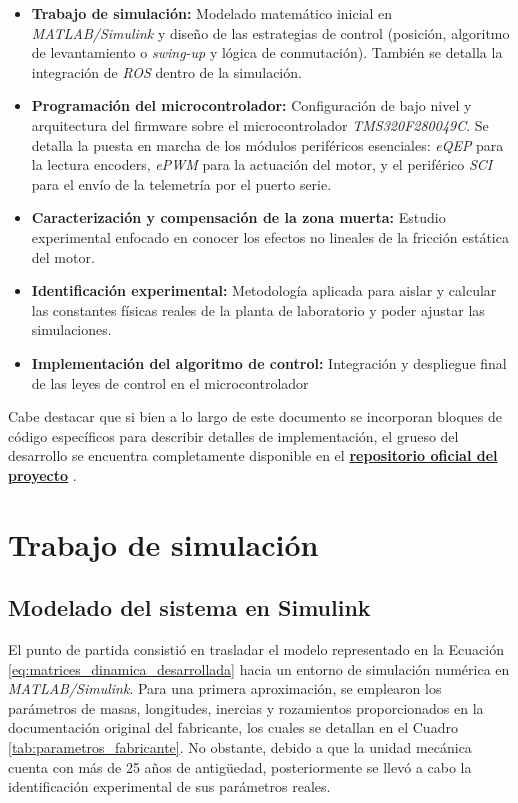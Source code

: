\documentclass[11pt,fleqn]{book} %
\begin{document}
\begin{itemize}
	\item \textbf{Trabajo de simulación:} Modelado matemático inicial en \textit{MATLAB/Simulink} y diseño de las estrategias de control (posición, algoritmo de levantamiento o \textit{swing-up} y lógica de conmutación). También se detalla la integración de \textit{ROS} dentro de la simulación.
	
	\item \textbf{Programación del microcontrolador:} Configuración de bajo nivel y arquitectura del firmware sobre el microcontrolador \textit{TMS320F280049C}. Se detalla la puesta en marcha de los módulos periféricos esenciales:\textit{ eQEP} para la lectura encoders, \textit{ePWM} para la actuación del motor, y el periférico \textit{SCI} para el envío de la telemetría por el puerto serie.
	
	\item \textbf{Caracterización y compensación de la zona muerta:} Estudio experimental enfocado en conocer los efectos no lineales de la fricción estática del motor.
	
	\item \textbf{Identificación experimental:} Metodología aplicada para aislar y calcular las constantes físicas reales de la planta de laboratorio y poder ajustar las simulaciones.
	
	\item \textbf{Implementación del algoritmo de control:} Integración y despliegue final de las leyes de control en el microcontrolador
\end{itemize}

Cabe destacar que si bien a lo largo de este documento se incorporan bloques de código específicos para describir detalles de implementación, el grueso del desarrollo se encuentra completamente disponible en el \href{https://github.com/MPV247/TFG_Control_MiguelPorcar}{\textbf{repositorio oficial del proyecto}} \cite{Porcar2026TFG}.

\newpage
\section{Trabajo de simulación}

\subsection{Modelado del sistema en Simulink}
\label{cap:modelado_sim}
El punto de partida consistió en trasladar el modelo representado en la Ecuación \ref{eq:matrices_dinamica_desarrollada} hacia un entorno de simulación numérica en \textit{MATLAB/Simulink}. Para una primera aproximación, se emplearon los parámetros de masas, longitudes, inercias y rozamientos proporcionados en la documentación original del fabricante, los cuales se detallan en el Cuadro \ref{tab:parametros_fabricante}. No obstante, debido a que la unidad mecánica cuenta con más de 25 años de antigüedad, posteriormente se llevó a cabo la identificación experimental de sus parámetros reales.
\end{document}

